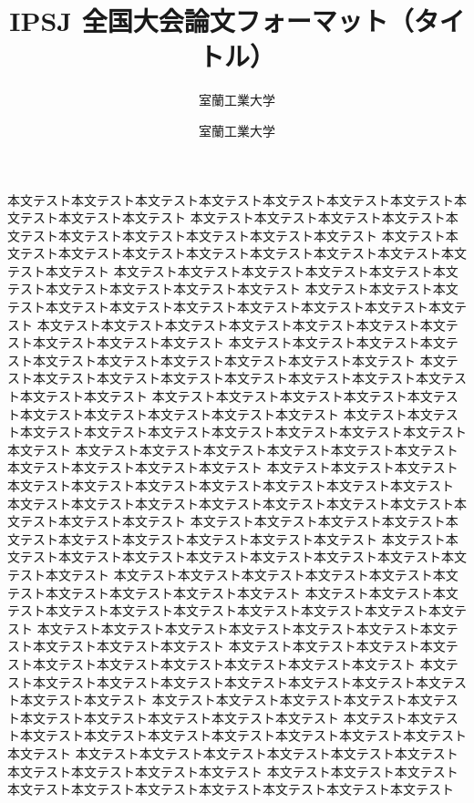 \documentclass[uplatex,dvipdfmx,a4paper,twocolumn,base=11pt,jbase=11pt,ja=standard]{bxjsarticle}
\title{IPSJ 全国大会論文フォーマット（タイトル）}{「タイトル」英文による記述}
\author{室蘭工業大学}{室蘭 太郎}{Taro Muroran, Muroran Institute of Technology}
\author{室蘭工業大学}{工業 太郎}{Taro Kogyo, Muroran Institute of Technology}
\begin{document}
\maketitle

本文テスト本文テスト本文テスト本文テスト本文テスト本文テスト本文テスト本文テスト本文テスト本文テスト
本文テスト本文テスト本文テスト本文テスト本文テスト本文テスト本文テスト本文テスト本文テスト本文テスト
本文テスト本文テスト本文テスト本文テスト本文テスト本文テスト本文テスト本文テスト本文テスト本文テスト
本文テスト本文テスト本文テスト本文テスト本文テスト本文テスト本文テスト本文テスト本文テスト本文テスト
本文テスト本文テスト本文テスト本文テスト本文テスト本文テスト本文テスト本文テスト本文テスト本文テスト
本文テスト本文テスト本文テスト本文テスト本文テスト本文テスト本文テスト本文テスト本文テスト本文テスト
本文テスト本文テスト本文テスト本文テスト本文テスト本文テスト本文テスト本文テスト本文テスト本文テスト
本文テスト本文テスト本文テスト本文テスト本文テスト本文テスト本文テスト本文テスト本文テスト本文テスト
本文テスト本文テスト本文テスト本文テスト本文テスト本文テスト本文テスト本文テスト本文テスト本文テスト
本文テスト本文テスト本文テスト本文テスト本文テスト本文テスト本文テスト本文テスト本文テスト本文テスト
本文テスト本文テスト本文テスト本文テスト本文テスト本文テスト本文テスト本文テスト本文テスト本文テスト
本文テスト本文テスト本文テスト本文テスト本文テスト本文テスト本文テスト本文テスト本文テスト本文テスト
本文テスト本文テスト本文テスト本文テスト本文テスト本文テスト本文テスト本文テスト本文テスト本文テスト
本文テスト本文テスト本文テスト本文テスト本文テスト本文テスト本文テスト本文テスト本文テスト本文テスト
本文テスト本文テスト本文テスト本文テスト本文テスト本文テスト本文テスト本文テスト本文テスト本文テスト
本文テスト本文テスト本文テスト本文テスト本文テスト本文テスト本文テスト本文テスト本文テスト本文テスト
本文テスト本文テスト本文テスト本文テスト本文テスト本文テスト本文テスト本文テスト本文テスト本文テスト
本文テスト本文テスト本文テスト本文テスト本文テスト本文テスト本文テスト本文テスト本文テスト本文テスト
本文テスト本文テスト本文テスト本文テスト本文テスト本文テスト本文テスト本文テスト本文テスト本文テスト
本文テスト本文テスト本文テスト本文テスト本文テスト本文テスト本文テスト本文テスト本文テスト本文テスト
本文テスト本文テスト本文テスト本文テスト本文テスト本文テスト本文テスト本文テスト本文テスト本文テスト
本文テスト本文テスト本文テスト本文テスト本文テスト本文テスト本文テスト本文テスト本文テスト本文テスト
本文テスト本文テスト本文テスト本文テスト本文テスト本文テスト本文テスト本文テスト本文テスト本文テスト
本文テスト本文テスト本文テスト本文テスト本文テスト本文テスト本文テスト本文テスト本文テスト本文テスト
\end{document}

